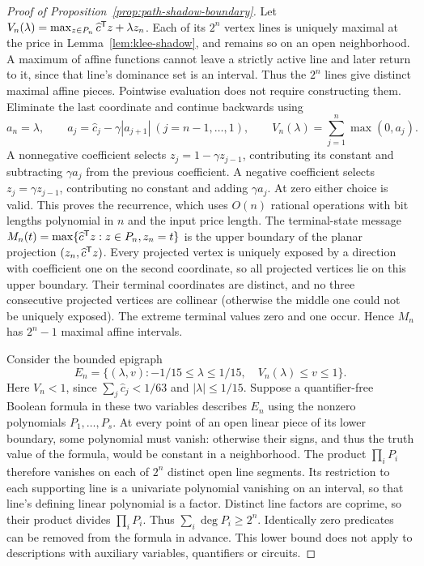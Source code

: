 \begin{proof}[Proof of Proposition~\ref{prop:path-shadow-boundary}]
Let \(V_n(\lambda)=\max_{z\in P_n}\widehat c^{\mathsf T} z+\lambda z_n\).
Each of its \(2^n\) vertex lines is uniquely maximal at the price in
Lemma~\ref{lem:klee-shadow}, and remains so on an open neighborhood. A maximum
of affine functions cannot leave a strictly active line and later return to
it, since that line's dominance set is an interval. Thus the \(2^n\) lines
give distinct maximal affine pieces.
Pointwise evaluation does not require constructing them. Eliminate the last
coordinate and continue backwards using
\[
 a_n=\lambda,\qquad a_j=\widehat c_j-\gamma|a_{j+1}|\ (j=n-1,\ldots,1),
 \qquad V_n(\lambda)=\sum_{j=1}^n\max(0,a_j).
\]
A nonnegative coefficient selects \(z_j=1-\gamma z_{j-1}\), contributing its
constant and subtracting \(\gamma a_j\) from the previous coefficient. A
negative coefficient selects \(z_j=\gamma z_{j-1}\), contributing no constant
and adding \(\gamma a_j\). At zero either choice is valid. This proves the
recurrence, which uses \(O(n)\) rational operations with bit lengths
polynomial in \(n\) and the input price length.
The terminal-state message
\(M_n(t)=\max\{\widehat c^{\mathsf T} z:z\in P_n,z_n=t\}\) is the upper boundary
of the planar projection \((z_n,\widehat c^{\mathsf T} z)\). Every projected vertex
is uniquely exposed by a direction with coefficient one on the second
coordinate, so all projected vertices lie on this upper boundary. Their terminal coordinates
are distinct, and no three consecutive projected vertices are collinear
(otherwise the middle one could not be uniquely exposed). The extreme terminal
values zero and one occur. Hence \(M_n\) has \(2^n-1\) maximal affine intervals.

Consider the bounded epigraph
\[
 E_n=\{(\lambda,v):-1/15\le\lambda\le1/15,\quad
                         V_n(\lambda)\le v\le1\}.
\]
Here \(V_n<1\), since \(\sum_j\widehat c_j<1/63\) and \(|\lambda|\le1/15\).
Suppose a quantifier-free Boolean formula in these two variables describes
\(E_n\) using the nonzero polynomials \(P_1,\ldots,P_s\).
At every point of an open linear piece of its lower boundary, some polynomial
must vanish: otherwise their signs, and thus the truth value of the formula,
would be constant in a neighborhood. The product \(\prod_iP_i\) therefore
vanishes on each of \(2^n\) distinct open line segments. Its restriction to
each supporting line is a univariate polynomial vanishing on an interval, so
that line's defining linear polynomial is a factor. Distinct line factors are
coprime, so their product divides \(\prod_iP_i\). Thus
\(\sum_i\deg P_i\ge2^n\). Identically zero predicates can be removed from
the formula in advance. This lower bound does not apply to descriptions with
auxiliary variables, quantifiers or circuits.
\end{proof}

